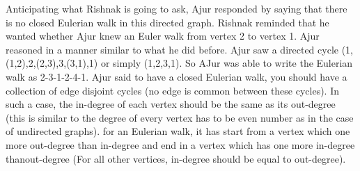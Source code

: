 Anticipating what Rishnak is going to ask, Ajur responded by saying that there is no closed Eulerian walk in this directed graph. Rishnak reminded that he wanted whether Ajur knew an Euler walk from vertex 2 to vertex 1. Ajur reasoned in a  manner similar to what he did before. Ajur saw a directed cycle (1,(1,2),2,(2,3),3,(3,1),1) or simply (1,2,3,1). So AJur was able to write the Eulerian walk as 2-3-1-2-4-1. Ajur said to have a closed Eulerian walk, you should have a collection of edge disjoint cycles (no edge is common between these cycles). In such a case, the in-degree of each vertex should be the same as its out-degree (this is similar to the degree of every vertex has to be even number as in the case of undirected graphs). for an Eulerian walk, it has start from a vertex which one more out-degree than in-degree and end in a vertex which has one more in-degree thanout-degree (For all other vertices, in-degree should be equal to out-degree).
